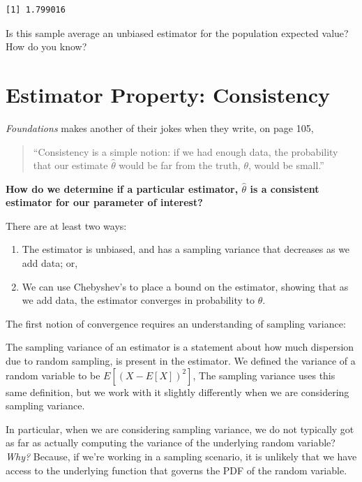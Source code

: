 \documentclass[
  letterpaper,
  DIV=11,
  numbers=noendperiod]{scrreprt}
\providecommand{\tightlist}{%
  \setlength{\itemsep}{0pt}\setlength{\parskip}{0pt}}\usepackage{longtable,booktabs,array}
\begin{document}
\begin{verbatim}
[1] 1.799016
\end{verbatim}

Is this sample average an unbiased estimator for the population expected
value? How do you know?

\section{Estimator Property:
Consistency}\label{estimator-property-consistency}

\emph{Foundations} makes another of their jokes when they write, on page
105,

\begin{quote}
``Consistency is a simple notion: if we had enough data, the probability
that our estimate \(\hat{\theta}\) would be far from the truth,
\(\theta\), would be small.''
\end{quote}

\textbf{How do we determine if a particular estimator, \(\hat{\theta}\)
is a consistent estimator for our parameter of interest?}

There are at least two ways:

\begin{enumerate}
\def\labelenumi{\arabic{enumi}.}
\tightlist
\item
  The estimator is unbiased, and has a sampling variance that decreases
  as we add data; or,
\item
  We can use Chebyshev's to place a bound on the estimator, showing that
  as we add data, the estimator converges in probability to \(\theta\).
\end{enumerate}

The first notion of convergence requires an understanding of sampling
variance:

The sampling variance of an estimator is a statement about how much
dispersion due to random sampling, is present in the estimator. We
defined the variance of a random variable to be
\(E\left[(X - E[X])^{2}\right]\), The sampling variance uses this same
definition, but we work with it slightly differently when we are
considering sampling variance.

In particular, when we are considering sampling variance, we do not
typically got as far as actually computing the variance of the
underlying random variable? \emph{Why?} Because, if we're working in a
sampling scenario, it is unlikely that we have access to the underlying
function that governs the PDF of the random variable.
\end{document}
